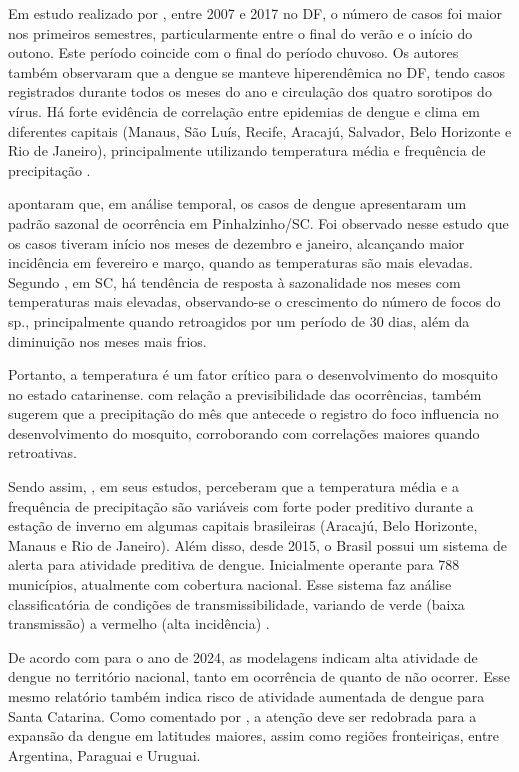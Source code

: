 \indent Em estudo realizado por , entre 2007 e 2017 no \acrfull{DF}, o número de casos foi maior nos primeiros semestres, particularmente entre o final do verão e o início do outono. Este período  coincide com o final do período chuvoso. Os autores também observaram que a dengue se manteve hiperendêmica no \acrlong{DF}, tendo casos registrados durante todos os meses do ano e circulação dos quatro sorotipos do vírus. Há forte evidência de correlação entre epidemias de dengue e clima em diferentes capitais (Manaus, São Luís, Recife, Aracajú, Salvador, Belo Horizonte e Rio de Janeiro), principalmente utilizando temperatura média e frequência de precipitação \cite{ForecastingDengueBrazil2019}.

\indent {} apontaram que, em análise temporal, os casos de dengue apresentaram um padrão sazonal de ocorrência em Pinhalzinho/\acrshort{SC}. Foi observado nesse estudo que os casos tiveram início nos meses de dezembro e janeiro, alcançando
maior incidência em fevereiro e março, quando as temperaturas são mais elevadas. Segundo , em \acrlong{SC}, há tendência de resposta à sazonalidade nos meses com temperaturas mais elevadas, observando-se o crescimento do número de focos do  sp.,  principalmente quando retroagidos por um período de 30 dias, além da diminuição nos meses mais frios.

\indent Portanto, a temperatura é um fator crítico para o desenvolvimento do mosquito no estado catarinense. com relação a previsibilidade das ocorrências,  também sugerem que a precipitação do mês que antecede o registro do foco influencia no desenvolvimento do mosquito, corroborando com correlações maiores quando retroativas.

\indent Sendo assim, , em seus estudos, perceberam que a temperatura média e a frequência de precipitação são variáveis com forte poder preditivo durante a estação de inverno em algumas capitais brasileiras (Aracajú, Belo Horizonte, Manaus e Rio de Janeiro). Além disso, desde 2015, o Brasil possui um sistema de alerta para atividade preditiva de dengue. Inicialmente operante para 788 municípios, atualmente com cobertura nacional. Esse sistema faz análise classificatória de condições de transmissibilidade, variando de verde (baixa transmissão) a vermelho (alta incidência) \cite{Infodengue_2018}.

\indent De acordo com  para o ano de 2024, as modelagens indicam alta atividade de dengue no território nacional, tanto em ocorrência de  quanto de não ocorrer. Esse mesmo relatório também indica risco de atividade aumentada de dengue para Santa Catarina. Como comentado por , a atenção deve ser redobrada para a expansão da dengue em latitudes maiores, assim como regiões fronteiriças, entre Argentina, Paraguai e Uruguai.


